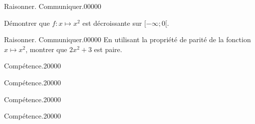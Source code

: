 
\begin{pageParcoursd} %

\begin{ExoCdN}{Raisonner. Communiquer.}{0}{0}{0}{0}{0}

Démontrer que $f:x\mapsto x^2$ est décroissante sur $[-\infty;0[$.\vspace{.2cm}


\end{ExoCdN}

\begin{ExoCdN}{Raisonner. Communiquer.}{0}{0}{0}{0}{0}
En utilisant la propriété de parité de la fonction $x\mapsto x^2$, montrer que $2x^2+3$ est paire.\vspace{.2cm}

\end{ExoCdN}

\begin{ExoCdN}{Compétence.}{2}{0}{0}{0}{0}

\end{ExoCdN}

\begin{ExoCdN}{Compétence.}{2}{0}{0}{0}{0}

\end{ExoCdN}

\begin{ExoCdN}{Compétence.}{2}{0}{0}{0}{0}

\end{ExoCdN}

\begin{ExoCdN}{Compétence.}{2}{0}{0}{0}{0}

\end{ExoCdN}

\end{pageParcoursd} %


